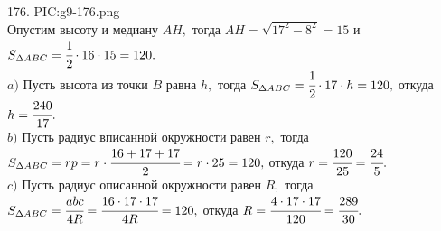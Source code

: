 176. {{PIC:g9-176.png}}\\
Опустим высоту и медиану $AH,$ тогда $AH=\sqrt{17^2-8^2}=15$ и $S_{\Delta ABC}=\cfrac{1}{2}\cdot16\cdot15=120.$\\
$a)$ Пусть высота из точки $B$ равна $h,$ тогда $S_{\Delta ABC}=\cfrac{1}{2}\cdot17\cdot h=120,$ откуда $h=\cfrac{240}{17}.$\\
$b)$ Пусть радиус вписанной окружности равен $r,$ тогда $S_{\Delta ABC}=rp=r\cdot\cfrac{16+17+17}{2}=r\cdot25=120,$ откуда $r=\cfrac{120}{25}=\cfrac{24}{5}.$\\
$c)$ Пусть радиус описанной окружности равен $R,$ тогда $S_{\Delta ABC}=\cfrac{abc}{4R}=\cfrac{16\cdot17\cdot17}{4R}=120,$ откуда $R=\cfrac{4\cdot17\cdot17}{120}=\cfrac{289}{30}.$\\
